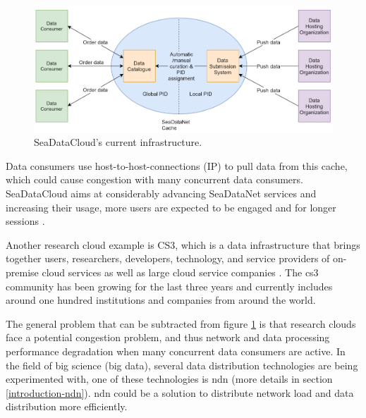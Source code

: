 \begin{figure}[H]
\centering
\includegraphics[scale=0.57]{Images/SDC_current.png}
\caption{SeaDataCloud's current infrastructure.}
\label{fig:sdc_cur}
\end{figure}

Data consumers use host-to-host-connections (IP) to pull data from this cache, which could cause congestion with many concurrent data consumers. SeaDataCloud aims at considerably advancing SeaDataNet services and increasing their usage, more users are expected to be engaged and for longer sessions \cite{sdc-eu}.
 
Another research cloud example is CS3, which is a data infrastructure that brings together users, researchers, developers, technology, and service providers of on-premise cloud services as well as large cloud service companies \cite{cs3}. The \gls{cs3} community has been growing for the last three years and currently includes around one hundred institutions and companies from around the world.

The general problem that can be subtracted from figure \ref{fig:sdc_cur} is that research clouds face a potential congestion problem, and thus network and data processing performance degradation when many concurrent data consumers are active. In the field of big science (big data), several data distribution technologies are being experimented with, one of these technologies is \gls{ndn} (more details in section \ref{introduction-ndn}). \gls{ndn} could be a solution to distribute network load and data distribution more efficiently.


